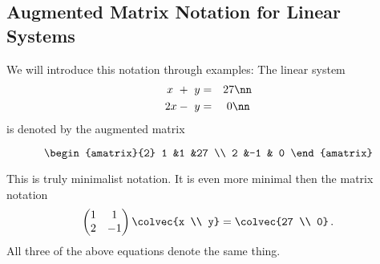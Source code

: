 \subsection{Augmented Matrix Notation for Linear Systems}

We will introduce this notation through examples: 
The linear system 
\begin{eqnarray}
	x\ +\ y & = & 27\nn \\
	2x-\ y & = &\  0\nn \,
\end{eqnarray}
is denoted by the augmented matrix

\[
\begin{amatrix}{2}
1 &1 &27 \\ 2 &-1 & 0
\end{amatrix}
\]

\noindent
This is truly minimalist notation. It is even more minimal then the matrix notation  
\begin{equation*}
    \begin{pmatrix}
      1             &1  \\
      2             &-1
    \end{pmatrix}
  \colvec{x \\ y}
  =
  \colvec{27 \\ 0}\, .
\end{equation*}
All three of the above equations denote the same thing. 



